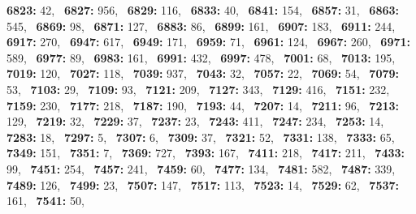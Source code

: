 \textbf{6823:} 42,\allowbreak~ 
\textbf{6827:} 956,\allowbreak~ 
\textbf{6829:} 116,\allowbreak~ 
\textbf{6833:} 40,\allowbreak~ 
\textbf{6841:} 154,\allowbreak~ 
\textbf{6857:} 31,\allowbreak~ 
\textbf{6863:} 545,\allowbreak~ 
\textbf{6869:} 98,\allowbreak~ 
\textbf{6871:} 127,\allowbreak~ 
\textbf{6883:} 86,\allowbreak~ 
\textbf{6899:} 161,\allowbreak~ 
\textbf{6907:} 183,\allowbreak~ 
\textbf{6911:} 244,\allowbreak~ 
\textbf{6917:} 270,\allowbreak~ 
\textbf{6947:} 617,\allowbreak~ 
\textbf{6949:} 171,\allowbreak~ 
\textbf{6959:} 71,\allowbreak~ 
\textbf{6961:} 124,\allowbreak~ 
\textbf{6967:} 260,\allowbreak~ 
\textbf{6971:} 589,\allowbreak~ 
\textbf{6977:} 89,\allowbreak~ 
\textbf{6983:} 161,\allowbreak~ 
\textbf{6991:} 432,\allowbreak~ 
\textbf{6997:} 478,\allowbreak~ 
\textbf{7001:} 68,\allowbreak~ 
\textbf{7013:} 195,\allowbreak~ 
\textbf{7019:} 120,\allowbreak~ 
\textbf{7027:} 118,\allowbreak~ 
\textbf{7039:} 937,\allowbreak~ 
\textbf{7043:} 32,\allowbreak~ 
\textbf{7057:} 22,\allowbreak~ 
\textbf{7069:} 54,\allowbreak~ 
\textbf{7079:} 53,\allowbreak~ 
\textbf{7103:} 29,\allowbreak~ 
\textbf{7109:} 93,\allowbreak~ 
\textbf{7121:} 209,\allowbreak~ 
\textbf{7127:} 343,\allowbreak~ 
\textbf{7129:} 416,\allowbreak~ 
\textbf{7151:} 232,\allowbreak~ 
\textbf{7159:} 230,\allowbreak~ 
\textbf{7177:} 218,\allowbreak~ 
\textbf{7187:} 190,\allowbreak~ 
\textbf{7193:} 44,\allowbreak~ 
\textbf{7207:} 14,\allowbreak~ 
\textbf{7211:} 96,\allowbreak~ 
\textbf{7213:} 129,\allowbreak~ 
\textbf{7219:} 32,\allowbreak~ 
\textbf{7229:} 37,\allowbreak~ 
\textbf{7237:} 23,\allowbreak~ 
\textbf{7243:} 411,\allowbreak~ 
\textbf{7247:} 234,\allowbreak~ 
\textbf{7253:} 14,\allowbreak~ 
\textbf{7283:} 18,\allowbreak~ 
\textbf{7297:} 5,\allowbreak~ 
\textbf{7307:} 6,\allowbreak~ 
\textbf{7309:} 37,\allowbreak~ 
\textbf{7321:} 52,\allowbreak~ 
\textbf{7331:} 138,\allowbreak~ 
\textbf{7333:} 65,\allowbreak~ 
\textbf{7349:} 151,\allowbreak~ 
\textbf{7351:} 7,\allowbreak~ 
\textbf{7369:} 727,\allowbreak~ 
\textbf{7393:} 167,\allowbreak~ 
\textbf{7411:} 218,\allowbreak~ 
\textbf{7417:} 211,\allowbreak~ 
\textbf{7433:} 99,\allowbreak~ 
\textbf{7451:} 254,\allowbreak~ 
\textbf{7457:} 241,\allowbreak~ 
\textbf{7459:} 60,\allowbreak~ 
\textbf{7477:} 134,\allowbreak~ 
\textbf{7481:} 582,\allowbreak~ 
\textbf{7487:} 339,\allowbreak~ 
\textbf{7489:} 126,\allowbreak~ 
\textbf{7499:} 23,\allowbreak~ 
\textbf{7507:} 147,\allowbreak~ 
\textbf{7517:} 113,\allowbreak~ 
\textbf{7523:} 14,\allowbreak~ 
\textbf{7529:} 62,\allowbreak~ 
\textbf{7537:} 161,\allowbreak~ 
\textbf{7541:} 50,\allowbreak~ 

